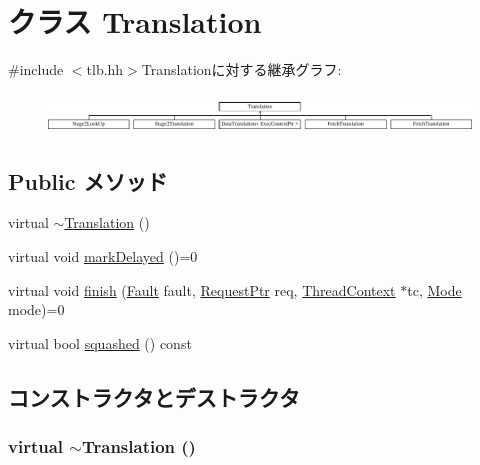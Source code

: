 \hypertarget{classBaseTLB_1_1Translation}{
\section{クラス Translation}
\label{classBaseTLB_1_1Translation}
}


{\ttfamily \#include $<$tlb.hh$>$}Translationに対する継承グラフ:\begin{figure}[H]
\begin{center}
\leavevmode
\includegraphics[height=1.02752cm]{classBaseTLB_1_1Translation}
\end{center}
\end{figure}
\subsection*{Public メソッド}
\begin{DoxyCompactItemize}
\item 
virtual \hyperlink{classBaseTLB_1_1Translation_a19361aa4aa14216656427478c5ccabb8}{$\sim$Translation} ()
\item 
virtual void \hyperlink{classBaseTLB_1_1Translation_ab88d5e1938190b55d7859d5cc4d10446}{markDelayed} ()=0
\item 
virtual void \hyperlink{classBaseTLB_1_1Translation_a5698e0a932f298729d10355d4384e565}{finish} (\hyperlink{classRefCountingPtr}{Fault} fault, \hyperlink{classRequest}{RequestPtr} req, \hyperlink{classThreadContext}{ThreadContext} $\ast$tc, \hyperlink{classBaseTLB_a46c8a310cf4c094f8c80e1cb8dc1f911}{Mode} mode)=0
\item 
virtual bool \hyperlink{classBaseTLB_1_1Translation_a1c71e1db7a83ffde808111e2b1cec6c6}{squashed} () const 
\end{DoxyCompactItemize}


\subsection{コンストラクタとデストラクタ}
\hypertarget{classBaseTLB_1_1Translation_a19361aa4aa14216656427478c5ccabb8}{
\subsubsection[{$\sim$Translation}]{\setlength{\rightskip}{0pt plus 5cm}virtual $\sim${\bf Translation} ()}}
\label{classBaseTLB_1_1Translation_a19361aa4aa14216656427478c5ccabb8}



